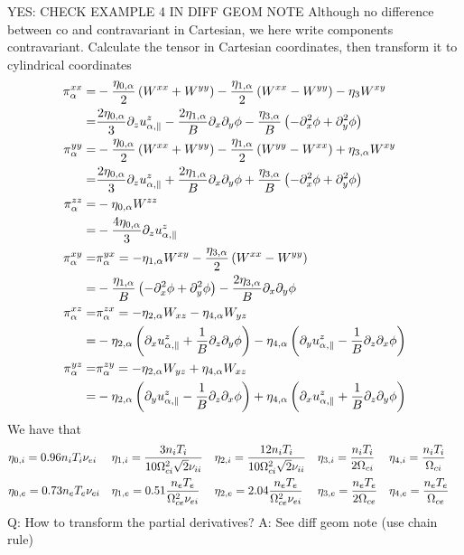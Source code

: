 YES: CHECK EXAMPLE 4 IN DIFF GEOM NOTE
%
Although no difference between co and contravariant in Cartesian, we here write
components contravariant. Calculate the tensor in Cartesian coordinates, then
transform it to cylindrical coordinates
%
\begin{align*}
    \pi^{xx}_{\alpha}
    =& -\frac{\eta_{0,\alpha}}{2}\left(W^{xx} + W^{yy}\right)
       -\frac{\eta_{1,\alpha}}{2}\left(W^{xx} - W^{yy}\right)
       -\eta_3 W^{xy}
    \\
    =&  \frac{2\eta_{0,\alpha}}{3}\partial_z u^{z}_{\alpha,\|}
       -\frac{2\eta_{1,\alpha}}{B}\partial_x \partial_y \phi
       -\frac{ \eta_{3,\alpha}}{B}\left(-\partial_x^2 \phi
       + \partial_y^2 \phi \right)
    \\
\pi^{yy}_{\alpha}
    =& -\frac{\eta_{0,\alpha}}{2}\left(W^{xx} + W^{yy}\right)
       -\frac{\eta_{1,\alpha}}{2}\left(W^{yy} - W^{xx}\right)
       +\eta_{3,\alpha}W^{xy}
    \\
    =&  \frac{2\eta_{0,\alpha}}{3}\partial_z u^{z}_{\alpha,\|}
       +\frac{2\eta_{1,\alpha}}{B}\partial_x \partial_y \phi
       +\frac{ \eta_{3,\alpha}}{B}\left(-\partial_x^2 \phi + \partial_y^2 \phi \right)
    \\
\pi^{zz}_{\alpha}
    =& -\eta_{0,\alpha}W^{zz}
    \\
    =& - \frac{4\eta_{0,\alpha}}{3} \partial_z u^{z}_{\alpha,\|}
    \\
\pi^{xy}_{\alpha} =& \pi^{yx}_{\alpha}
    = -\eta_{1,\alpha}W^{xy} -\frac{\eta_{3,\alpha}}{2} \left(W^{xx}-W^{yy}\right)
    \\
    =& -\frac{\eta_{1,\alpha}}{B}\left(-\partial_x^2 \phi + \partial_y^2 \phi \right)
    -\frac{2\eta_{3,\alpha}}{B}\partial_x \partial_y \phi
    \\
\pi^{xz}_{\alpha} =& \pi^{zx}_{\alpha}
    = -\eta_{2,\alpha}W_{xz} - \eta_{4,\alpha}W_{yz}
    \\
    =& -\eta_{2,\alpha}\left(\partial_x u^{z}_{\alpha, \|} + \frac{1}{B}\partial_z \partial_y \phi\right)
        - \eta_{4,\alpha}\left(\partial_y u^{z}_{\alpha,\|} - \frac{1}{B} \partial_z \partial_x \phi\right)
    \\
\pi^{yz}_{\alpha} =& \pi^{zy}_{\alpha}
    = -\eta_{2,\alpha}W_{yz} + \eta_{4,\alpha}W_{xz}
    \\
    =& -\eta_{2,\alpha}\left(\partial_y u^{z}_{\alpha,\|} - \frac{1}{B} \partial_z \partial_x \phi\right)
    + \eta_{4,\alpha}\left(\partial_x u^{z}_{\alpha, \|} + \frac{1}{B}\partial_z \partial_y \phi\right)
\end{align*}
%
We have that
%
\begin{align*}
    &\eta_{0,i}=0.96n_iT_i\nu_{ei} &
    &\eta_{1,i}=\frac{3n_iT_i}{10\Omega_{ci}^2 \sqrt{2}\nu_{ii}} &
    &\eta_{2,i}=\frac{12n_iT_i}{10\Omega_{ci}^2\sqrt{2}\nu_{ii}} &
    &\eta_{3,i}=\frac{n_iT_i}{2\Omega_{ci}} &
    &\eta_{4,i}=\frac{n_iT_i}{\Omega_{ci}} &
    \\
    &\eta_{0,e}=0.73n_eT_e\nu_{ei} &
    &\eta_{1,e}=0.51\frac{n_eT_e}{\Omega_{ce}^2\nu_{ei}} &
    &\eta_{2,e}=2.04\frac{n_eT_e}{\Omega_{ce}^2\nu_{ei}} &
    &\eta_{3,e}=\frac{n_eT_e}{2\Omega_{ce}} &
    &\eta_{4,e}=\frac{n_eT_e}{\Omega_{ce}} &
\end{align*}
Q: How to transform the partial derivatives?
A: See diff geom note (use chain rule)

